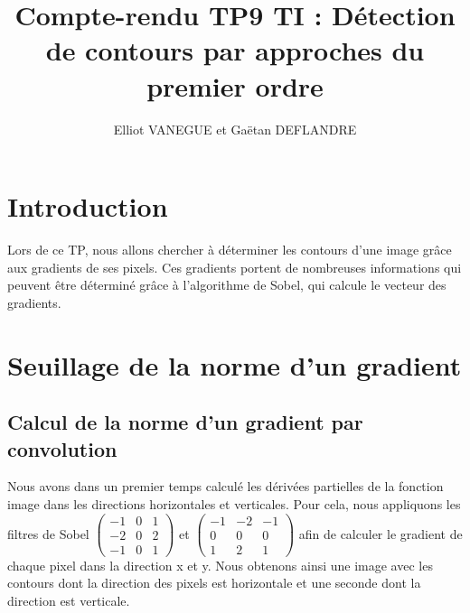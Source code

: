 \documentclass[a4paper,11pt]{article}
\title{Compte-rendu TP9 TI : Détection de contours par approches du premier ordre}
\author{Elliot VANEGUE et Gaëtan DEFLANDRE}
\begin{document}


  \maketitle
  
  \mbox{}
  \newpage
  \clearpage
  
  \section*{Introduction}
  Lors de ce TP, nous allons chercher à déterminer les contours d'une image grâce aux 
  gradients de ses pixels. Ces gradients portent de nombreuses informations qui peuvent
  être déterminé grâce à l'algorithme de Sobel, qui calcule le vecteur des gradients.
  
  \section{Seuillage de la norme d'un gradient}
  
  \subsection{Calcul de la norme d'un gradient par convolution}
  Nous avons dans un premier temps calculé les dérivées partielles de la fonction image dans les directions horizontales 
  et verticales. Pour cela, nous appliquons les filtres de Sobel
  $\begin{pmatrix}
     -1 & 0 & 1 \\
     -2 & 0 & 2 \\
     -1 & 0 & 1 
  \end{pmatrix}$ et 
   $\begin{pmatrix}
     -1 & -2 & -1 \\
     0 & 0 & 0 \\
     1 & 2 & 1
  \end{pmatrix}$
  afin de calculer le gradient de chaque pixel dans la direction x et y.
  Nous obtenons ainsi une image avec les contours dont la direction des pixels est horizontale et une seconde dont la direction est verticale.\\
  
\end{document}
